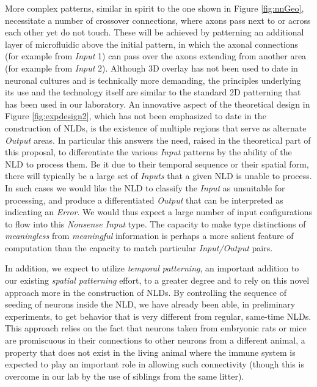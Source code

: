 More complex patterns, similar in spirit to the one shown in Figure \ref{fig:nnGeo}, necessitate a number of crossover connections, where axons pass next to or across each other yet do not touch. These will be achieved by patterning an additional layer of microfluidic above the initial pattern, in which the axonal connections (for example from {\it Input} 1) can pass over the axons extending from another area (for example from {\it Input} 2). Although 3D overlay has not been used to date in neuronal cultures and is technically more demanding, the principles underlying its use and the technology \cite{Rotem2012} itself are similar to the standard 2D patterning that has been used in our laboratory.
An innovative aspect of the theoretical design in Figure \ref{fig:expdesign2}, which has not been emphasized to date in the construction of NLDs, is the existence of multiple regions that serve as alternate {\it Output} areas. In particular this answers the need, raised in the theoretical part of this proposal, to differentiate the various {\it Input} patterns by the ability of the NLD to process them. Be it due to their temporal sequence or their spatial form, there will typically be a large set of {\it Inputs} that a given NLD is unable to process. In such cases we would like the NLD to classify the {\it Input} as unsuitable for processing, and produce a differentiated {\it Output} that can be interpreted as indicating an {\it Error}. We would thus expect a large number of input configurations to flow into this {\it Nonsense Input} type. The capacity to make type distinctions of {\it meaningless} from {\it meaningful} information is perhaps a more salient feature of computation than the capacity to match particular {\it Input/Output} pairs.

In addition, we expect to utilize {\it temporal patterning}, an important addition to our existing {\it spatial patterning} effort, to a greater degree and to rely on this novel approach more in the construction of NLDs. By controlling the sequence of seeding of neurons inside the NLD, we have already been able, in preliminary experiments, to get behavior that is very different from regular, same-time NLDs. This approach relies on the fact that neurons taken from embryonic rats or mice are promiscuous in their connections to other neurons from a different animal, a property that does not exist in the living animal where the immune system is expected to play an important role in allowing such connectivity (though this is overcome in our lab by the use of siblings from the same litter).

